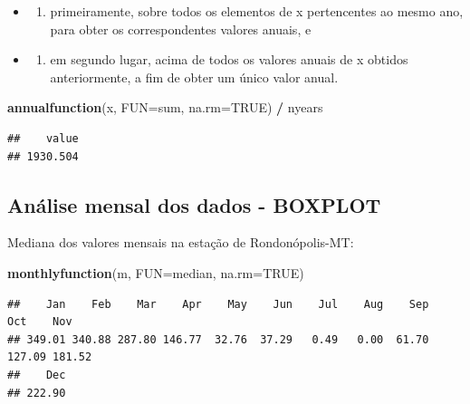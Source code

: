 \documentclass[
]{book}
\newenvironment{Shaded}{\begin{snugshade}}{\end{snugshade}}
\newcommand{\DataTypeTok}[1]{\textcolor[rgb]{0.13,0.29,0.53}{#1}}
\newcommand{\KeywordTok}[1]{\textcolor[rgb]{0.13,0.29,0.53}{\textbf{#1}}}
\newcommand{\NormalTok}[1]{#1}
\newcommand{\OperatorTok}[1]{\textcolor[rgb]{0.81,0.36,0.00}{\textbf{#1}}}
\newcommand{\OtherTok}[1]{\textcolor[rgb]{0.56,0.35,0.01}{#1}}
\newcommand{\StringTok}[1]{\textcolor[rgb]{0.31,0.60,0.02}{#1}}
\providecommand{\tightlist}{%
  \setlength{\itemsep}{0pt}\setlength{\parskip}{0pt}}
\begin{document}
\begin{itemize}
\item
  \begin{enumerate}
  \def\labelenumi{(\roman{enumi})}
  \tightlist
  \item
    primeiramente, sobre todos os elementos de x pertencentes ao mesmo ano, para obter os correspondentes valores anuais, e
  \end{enumerate}
\item
  \begin{enumerate}
  \def\labelenumi{(\roman{enumi})}
  \setcounter{enumi}{1}
  \tightlist
  \item
    em segundo lugar, acima de todos os valores anuais de x obtidos anteriormente, a fim de obter um único valor anual.
  \end{enumerate}
\end{itemize}

\begin{Shaded}
\begin{Highlighting}[]
\KeywordTok{annualfunction}\NormalTok{(x, }\DataTypeTok{FUN=}\NormalTok{sum, }\DataTypeTok{na.rm=}\OtherTok{TRUE}\NormalTok{) }\OperatorTok{/}\StringTok{ }\NormalTok{nyears}
\end{Highlighting}
\end{Shaded}

\begin{verbatim}
##    value 
## 1930.504
\end{verbatim}

\hypertarget{anuxe1lise-mensal-dos-dados---boxplot}{%
\subsection{Análise mensal dos dados - BOXPLOT}\label{anuxe1lise-mensal-dos-dados---boxplot}}

Mediana dos valores mensais na estação de Rondonópolis-MT:

\begin{Shaded}
\begin{Highlighting}[]
\KeywordTok{monthlyfunction}\NormalTok{(m, }\DataTypeTok{FUN=}\NormalTok{median, }\DataTypeTok{na.rm=}\OtherTok{TRUE}\NormalTok{)}
\end{Highlighting}
\end{Shaded}

\begin{verbatim}
##    Jan    Feb    Mar    Apr    May    Jun    Jul    Aug    Sep    Oct    Nov 
## 349.01 340.88 287.80 146.77  32.76  37.29   0.49   0.00  61.70 127.09 181.52 
##    Dec 
## 222.90
\end{verbatim}
\end{document}
